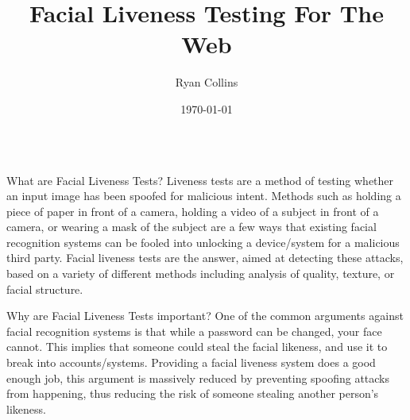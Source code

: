 \documentclass[final]{beamer}
\title[Final Year Project Poster]{Facial Liveness Testing For The Web}
\author[R Collins]{Ryan Collins}
\institute[Durham]{Department of Computer Science, Durham University}
\date{\today}
\begin{document}
  \begin{frame}{} 

  \vfill
    \begin{columns}[t]
      \begin{column}{.48\linewidth}
        \begin{block}{What are Facial Liveness Tests?}
            Liveness tests are a method of testing whether an input image has been spoofed for malicious intent.
            Methods such as holding a piece of paper in front of a camera, holding a video of a subject in front of a camera,
            or wearing a mask of the subject are a few ways that existing facial recognition systems can be fooled into unlocking
            a device/system for a malicious third party. Facial liveness tests are the answer, aimed at detecting these attacks, based on
            a variety of different methods including analysis of quality, texture, or facial structure.  
        \end{block}
        \begin{block}{Why are Facial Liveness Tests important?}
          One of the common arguments against facial recognition systems is that while a password can be changed, your face cannot.
          This implies that someone could steal the facial likeness, and use it to break into accounts/systems. Providing a facial liveness system does a good enough job,
          this argument is massively reduced by preventing spoofing attacks from happening, thus reducing the risk of someone stealing another person's likeness.
        \end{block}


\end{column}
\end{columns}
\end{frame}
\end{document}
